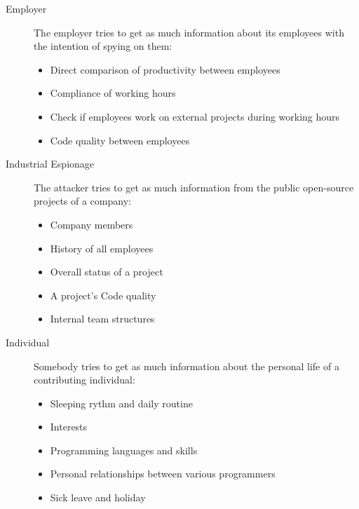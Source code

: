 \begin{description}
    \item[Employer]
        The employer tries to get as much information about its employees with the intention of spying on them:
        \begin{itemize}
            \item Direct comparison of productivity between employees
            \item Compliance of working hours
            \item Check if employees work on external projects during working hours
            \item Code quality between employees
        \end{itemize}

    \item[Industrial Espionage]
        The attacker tries to get as much information from the public open-source projects of a company:
        \begin{itemize}
            \item Company members
            \item History of all employees
            \item Overall status of a project
            \item A project's Code quality
            \item Internal team structures
        \end{itemize}

    \item[Individual]
        Somebody tries to get as much information about the personal life of a contributing individual:
        \begin{itemize}
            \item Sleeping rythm and daily routine
            \item Interests
            \item Programming languages and skills
            \item Personal relationships between various programmers
            \item Sick leave and holiday
        \end{itemize}

\end{description}

